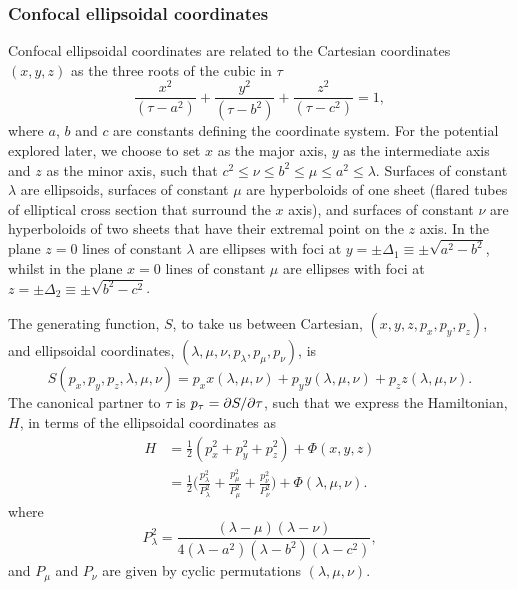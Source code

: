 \documentclass[useAMS,usenatbib,fleqn,a4paper]{mn2e}
\def\half{{\textstyle{\frac12}}}
\begin{document}
\subsubsection{Confocal ellipsoidal coordinates}
Confocal ellipsoidal coordinates are related to the Cartesian coordinates $(x,y,z)$ as the three roots of the cubic in $\tau$
\begin{equation}
\frac{x^2}{(\tau-a^2)}+\frac{y^2}{(\tau-b^2)}+\frac{z^2}{(\tau-c^2)} = 1,
\end{equation}
where $a$, $b$ and $c$ are constants defining the coordinate system. For the potential explored later, we choose to set $x$ as the major axis, $y$ as the intermediate axis and $z$ as the minor axis, such that $c^2\leq\nu\leq b^2\leq\mu\leq a^2\leq\lambda$. Surfaces of constant $\lambda$ are ellipsoids, surfaces of constant $\mu$ are hyperboloids of one sheet (flared tubes of elliptical cross section that surround the $x$ axis), and surfaces of constant $\nu$ are hyperboloids of two sheets that have their extremal point on the $z$ axis. In the plane $z=0$ lines of constant $\lambda$ are ellipses with foci at $y=\pm\Delta_1\equiv\pm\sqrt{a^2-b^2}$, whilst in the plane $x=0$ lines of constant $\mu$ are ellipses with foci at $z=\pm\Delta_2\equiv\pm\sqrt{b^2-c^2}$.

The generating function, $S$, to take us between Cartesian, $(x,y,z,p_x,p_y,p_z)$, and ellipsoidal coordinates, $(\lambda,\mu,\nu,p_\lambda,p_\mu,p_\nu)$, is
\begin{equation}
S(p_x,p_y,p_z,\lambda,\mu,\nu) = p_x x(\lambda,\mu,\nu)+p_y y(\lambda,\mu,\nu)+p_z z(\lambda,\mu,\nu).
\end{equation}
The canonical partner to $\tau$ is $p_\tau = \partial S/\partial \tau$, such that we express the Hamiltonian, $H$, in terms of the ellipsoidal coordinates as
\begin{equation}
\begin{split}
H &= \half(p_x^2+p_y^2+p_z^2)+\Phi(x,y,z)
\\&=\half\Big(\frac{p_\lambda^2}{P_\lambda^2}+\frac{p_\mu^2}{P_\mu^2}+\frac{p_\nu^2}{P_\nu^2}\Big)+\Phi(\lambda,\mu,\nu).
\end{split}
\label{Eq::Hamiltonian}
\end{equation}
where
\begin{equation}
P^2_\lambda = \frac{(\lambda-\mu)(\lambda-\nu)}{4(\lambda-a^2)(\lambda-b^2)(\lambda-c^2)},
\end{equation}
and $P_\mu$ and $P_\nu$ are given by cyclic permutations $(\lambda,\mu,\nu)$.
\end{document}
